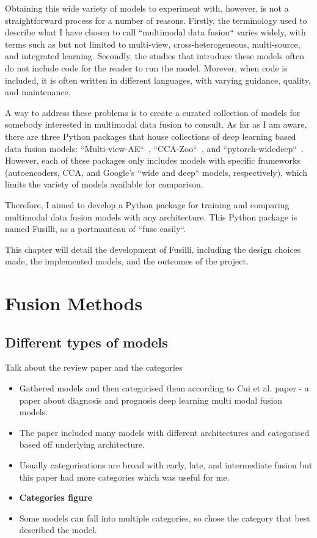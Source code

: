 Obtaining this wide variety of models to experiment with, however, is not a straightforward process for a number of reasons.
Firstly, the terminology used to describe what I have chosen to call ``multimodal data fusion`` varies widely, with terms such as but not limited to multi-view, cross-heterogeneous, multi-source, and integrated learning.
Secondly, the studies that introduce these models often do not include code for the reader to run the model.
Morever, when code is included, it is often written in different languages, with varying guidance, quality, and maintenance.

A way to address these problems is to create a curated collection of models for somebody interested in multimodal data fusion to consult.
As far as I am aware, there are three Python packages that house collections of deep learning based data fusion models: ``Multi-view-AE``~\cite{aguilaMultiviewAEPythonPackage2023}, ``CCA-Zoo``~\cite{chapmanCCAZooCollectionRegularized2021}, and ``pytorch-widedeep``~\cite{zaurinPytorchwidedeepFlexiblePackage2023}.
However, each of these packages only includes models with specific frameworks (autoencoders, CCA, and Google's ``wide and deep`` models, respectively), which limits the variety of models available for comparison.

Therefore, I aimed to develop a Python package for training and comparing multimodal data fusion models with any architecture.
This Python package is named Fusilli, as a portmanteau of ``fuse easily``.

This chapter will detail the development of Fusilli, including the design choices made, the implemented models, and the outcomes of the project.

\section{Fusion Methods}

\subsection{Different types of models}

Talk about the review paper and the categories

\begin{itemize}
    \item Gathered models and then categorised them according to Cui et al. paper - a paper about diagnosis and prognosis deep learning multi modal fusion models.
    \item The paper included many models with different architectures and categorised based off underlying architecture.
    \item Usually categorisations are broad with early, late, and intermediate fusion but this paper had more categories which was useful for me.
    \item \textbf{Categories figure}
    \item Some models can fall into multiple categories, so chose the category that best described the model.
\end{itemize}


